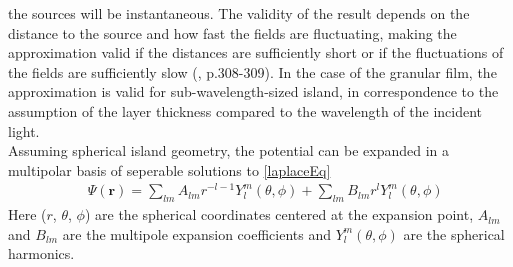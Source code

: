 the sources will be instantaneous. 
The validity of the result depends on the distance to the source
and how fast the fields are fluctuating, making the approximation valid if the distances are
sufficiently short or if the fluctuations of the fields are sufficiently slow
(\cite{Griffiths}, p.308-309).
%
In the case of the granular film, the approximation is valid for sub-wavelength-sized island,
in correspondence to the assumption of the layer thickness compared to the wavelength of the incident
light. \\
Assuming spherical island geometry, the potential can be expanded in a multipolar basis of
seperable solutions to \eqref{laplaceEq}
\begin{align}
   \label{multipoleSolution}
   &\Psi(\boldsymbol{r}) = \sum\limits_{lm} A_{lm} r^{-l-1} Y_l^m(\theta,\phi)
   + \sum\limits_{lm} B_{lm} r^{l} Y_l^m(\theta,\phi)
\end{align}
Here ($r$, $\theta$, $\phi$) are the spherical coordinates centered at the expansion point, 
$A_{lm}$ and $B_{lm}$ are the multipole expansion coefficients and $Y_l^m(\theta,\phi)$ are the
spherical harmonics.
%
